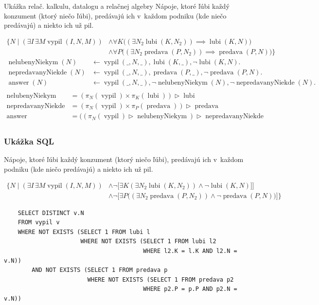 \documentclass[12pt]{beamer}
\DeclareMathOperator{\antijoin}{\rhd}
\DeclareMathOperator{\lubi}{lubi}
\DeclareMathOperator{\predava}{predava}
\DeclareMathOperator{\vypil}{vypil}
\DeclareMathOperator{\answer}{answer}
\begin{document}
\begin{frame}{Ukážka relač. kalkulu, datalogu a relačnej algebry}
Nápoje, ktoré ľúbi každý konzument (ktorý niečo ľúbi), predávajú ich v~každom podniku (kde niečo predávajú) a niekto ich už pil.

{\scriptsize
\begin{align*}
\Big\{N\mid (\exists I\,\exists M\vypil(I, N, M))&\land \forall K \Big( (\exists N_2\lubi(K, N_2))\implies \lubi(K, N)\Big)\\
&\land \forall P \Big((\exists N_2 \predava(P, N_2))\implies \predava(P, N)\Big)\Big\}
\end{align*}
}
{\scriptsize
\begin{align*}
\operatorname{nelubenyNiekym}(N) &\leftarrow \vypil(\_, N, \_), \lubi(K, \_), \lnot\lubi(K, N).\\
\operatorname{nepredavanyNiekde}(N) &\leftarrow \vypil(\_, N, \_), \predava(P, \_), \lnot\predava(P, N).\\
\answer(N) &\leftarrow \vypil(\_, N, \_), \lnot\operatorname{nelubenyNiekym}(N), \lnot\operatorname{nepredavanyNiekde}(N).\\
\end{align*}
}
\vskip -2mm
\vskip -2mm
{\scriptsize
\begin{align*}
\operatorname{nelubenyNiekym} & = (\pi_N(\vypil)\times \pi_K(\lubi))\antijoin \lubi\\
\operatorname{nepredavanyNiekde} & = (\pi_N(\vypil)\times \pi_P(\predava))\antijoin \predava\\
\answer & = ((\pi_N(\vypil) \antijoin \operatorname{nelubenyNiekym})\antijoin \operatorname{nepredavanyNiekde}\\
\end{align*}
}
\end{frame}

\begin{frame}[fragile]
\frametitle{Ukážka SQL}
Nápoje, ktoré ľúbi každý konzument (ktorý niečo ľúbi), predávajú ich v~každom podniku (kde niečo predávajú) a niekto ich už pil.

{\scriptsize
\begin{align*}
\Big\{N\mid (\exists I\,\exists M\vypil(I, N, M))&\land \lnot \Big[\exists K (\exists N_2\lubi(K, N_2))\land\lnot\lubi(K, N)\Big]\Big]\\
&\land \lnot\Big[\exists P \Big((\exists N_2 \predava(P, N_2))\land \lnot\predava(P, N)\Big)\Big]\Big\}
\end{align*}
}
\vskip -2mm
{\scriptsize
\begin{verbatim}
    SELECT DISTINCT v.N
    FROM vypil v
    WHERE NOT EXISTS (SELECT 1 FROM lubi l
                      WHERE NOT EXISTS (SELECT 1 FROM lubi l2
                                        WHERE l2.K = l.K AND l2.N = v.N))
        AND NOT EXISTS (SELECT 1 FROM predava p
                        WHERE NOT EXISTS (SELECT 1 FROM predava p2
                                        WHERE p2.P = p.P AND p2.N = v.N))
\end{verbatim}
}
\end{frame}
\end{document}
